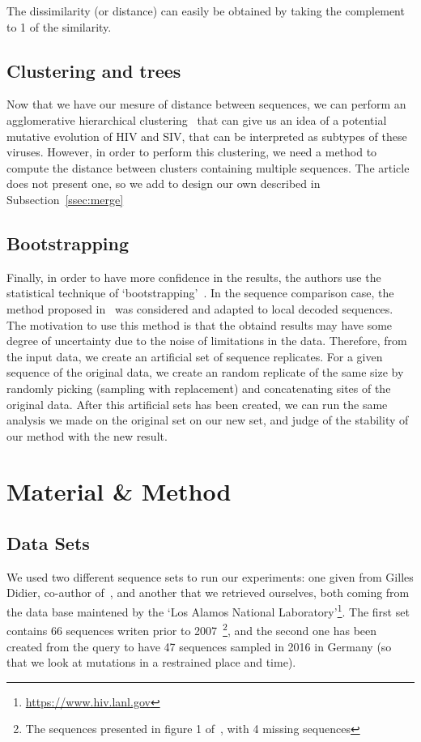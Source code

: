 \documentclass[english,13pt,a4paper]{article}
\theoremstyle{definition}
\theoremstyle{remark}
\theoremstyle{defstyle}
\begin{document}
The dissimilarity (or distance) can easily be obtained by taking the complement to 1 of the similarity.

\subsection{Clustering and trees}

Now that we have our mesure of distance between sequences, we can perform an agglomerative hierarchical clustering~\cite{anderberg1973cluster} that can give us an idea of a potential mutative evolution of HIV and SIV, that can be interpreted as subtypes of these viruses. However, in order to perform this clustering, we need a method to compute the distance between clusters containing multiple sequences. The article does not present one, so we add to design our own described in Subsection~\ref{ssec:merge} 


\subsection{Bootstrapping}

Finally, in order to have more confidence in the results, the authors use the statistical technique of `bootstrapping'~\cite{efron1979bootstrap}. In the sequence comparison case, the method proposed in~\cite{felsenstein1980confidence} was considered and adapted to local decoded sequences. The motivation to use this method is that the obtaind results may have some degree of uncertainty due to the noise of limitations in the data. Therefore, from the input data, we create an artificial set of sequence replicates. For a given sequence of the original data, we create an random replicate of the same size by randomly picking (sampling with replacement) and concatenating sites of the original data. After this artificial sets has been created, we can run the same analysis we made on the original set on our new set, and judge of the stability of our method with the new result. 

\section{Material \& Method}\label{sec:mat_method}

\subsection{Data Sets}\label{ssec:DS}

We used two different sequence sets to run our experiments: one given from Gilles Didier, co-author of~\cite{didier_comparing_2007}, and another that we retrieved ourselves, both coming from the data base maintened by the `Los Alamos National Laboratory'\footnote{\url{https://www.hiv.lanl.gov}}. The first set contains 66 sequences writen prior to 2007~\footnote{The sequences presented in figure 1 of~\cite{didier_comparing_2007}, with 4 missing sequences}, and the second one has been created from the query to have 47 sequences sampled in 2016 in Germany (so that we look at mutations in a restrained place and time).
\end{document}
